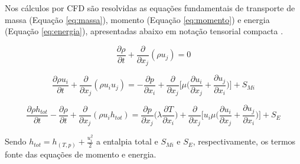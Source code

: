 Nos cálculos por CFD são resolvidas as equações fundamentais de transporte de massa (Equação \ref{eq:massa}),
momento (Equação \ref{eq:momento}) e energia (Equação \ref{eq:energia}), apresentadas abaixo em notação tensorial compacta \cite{dosSantos2012}.

\begin{equation}
  \label{eq:massa}
  \frac{\partial \rho}{\partial t}+\frac{\partial}{\partial x_j}(\rho u_j)=0
\end{equation}

\begin{equation}
  \label{eq:momento}
  \frac{\partial \rho u_i}{\partial t}+\frac{\partial}{\partial x_j}(\rho u_i u_j)=
  -\frac{\partial p}{\partial x_i} + \frac{\partial}{\partial x_j}\bigg[ \mu \bigg( \frac{\partial u_i}{\partial x_j} + \frac{\partial u_j}{\partial x_i}\bigg)\bigg]+S_{Mi}
\end{equation}

\begin{equation}
  \label{eq:energia}
  \frac{\partial \rho h_{tot}}{\partial t}-\frac{\partial \rho}{\partial t}+\frac{\partial}{\partial x_j}(\rho u_i h_{tot})=
  \frac{\partial p}{\partial x_j}\bigg( \lambda \frac{\partial T}{\partial x_i}\bigg) + \frac{\partial}{\partial x_j}\bigg[ u_i\mu \bigg( \frac{\partial u_i}{\partial x_j} + \frac{\partial u_j}{\partial x_i}\bigg)\bigg]+S_{E}
\end{equation}

Sendo $h_{tot} = h_{(T,p)} + \frac{u_i^{2}}{2}$ a entalpia total e $S_{Mi}$ e $S_E$, respectivamente, os termos
fonte das equações de momento e energia.






